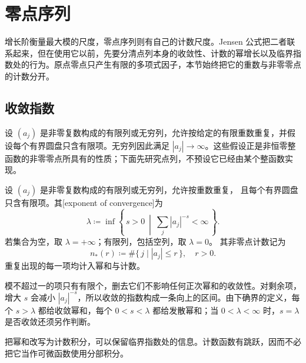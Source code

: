 \section{零点序列}
\label{b3:sec:1903}

增长阶衡量最大模的尺度，零点序列则有自己的计数尺度。Jensen 公式把二者联系起来，但在使用它以前，先要分清点列本身的收敛性、计数的幂增长以及临界指数处的行为。原点零点只产生有限的多项式因子，本节始终把它的重数与非零零点的计数分开。

\subsection{收敛指数}
\label{b3:subsec:190301}

设 \((a_j)\) 是非零复数构成的有限列或无穷列，允许按给定的有限重数重复，并假设每个有界圆盘只含有限项。无穷列因此满足 \(|a_j|\to\infty\)。这些假设正是非恒零整函数的非零零点所具有的性质；下面先研究点列，不预设它已经由某个整函数实现。

\begin{definition}[零点收敛指数]\label{b3:def:19-convergence-exponent}
设 \((a_j)\) 是非零复数构成的有限列或无穷列，允许按重数重复，
且每个有界圆盘只含有限项。其[exponent of convergence]为
\[
 \lambda\coloneqq
 \inf\left\{\,s>0\ \middle|\ \sum_j|a_j|^{-s}<\infty\,\right\}.
\]
若集合为空，取 \(\lambda=+\infty\)；有限列，包括空列，取 \(\lambda=0\)。
其非零点计数记为
\[
 n_*(r)\coloneqq\#\{\,j\mid |a_j|\le r\,\},\quad r>0.
\]
重复出现的每一项均计入幂和与计数。
\end{definition}

模不超过一的项只有有限个，删去它们不影响任何正次幂和的收敛性。对剩余项，增大 \(s\) 会减小 \(|a_j|^{-s}\)，所以收敛的指数构成一条向上的区间。由下确界的定义，每个 \(s>\lambda\) 都给收敛幂和，每个 \(0<s<\lambda\) 都给发散幂和；当 \(0<\lambda<\infty\) 时，\(s=\lambda\) 是否收敛还须另作判断。

\ProseParagraphBreak
把幂和改写为计数积分，可以保留临界指数处的信息。计数函数有跳跃，因而不必把它当作可微函数使用分部积分。

